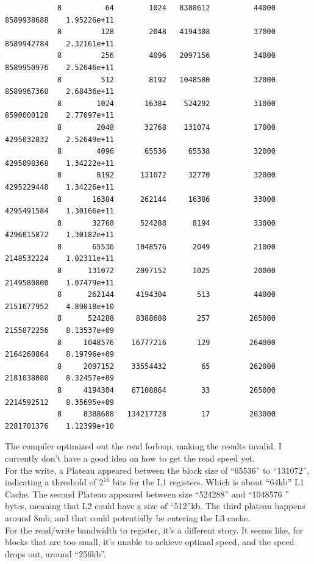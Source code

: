 \documentclass[]{article}
\begin{document}
\begin{lstlisting}
            8          64        1024   8388612          44000     8589938688    1.95226e+11
            8         128        2048   4194308          37000     8589942784    2.32161e+11
            8         256        4096   2097156          34000     8589950976    2.52646e+11
            8         512        8192   1048580          32000     8589967360    2.68436e+11
            8        1024       16384    524292          31000     8590000128    2.77097e+11
            8        2048       32768    131074          17000     4295032832    2.52649e+11
            8        4096       65536     65538          32000     4295098368    1.34222e+11
            8        8192      131072     32770          32000     4295229440    1.34226e+11
            8       16384      262144     16386          33000     4295491584    1.30166e+11
            8       32768      524288      8194          33000     4296015872    1.30182e+11
            8       65536     1048576      2049          21000     2148532224    1.02311e+11
            8      131072     2097152      1025          20000     2149580800    1.07479e+11
            8      262144     4194304       513          44000     2151677952    4.89018e+10
            8      524288     8388608       257         265000     2155872256    8.13537e+09
            8     1048576    16777216       129         264000     2164260864    8.19796e+09
            8     2097152    33554432        65         262000     2181038080    8.32457e+09
            8     4194304    67108864        33         265000     2214592512    8.35695e+09
            8     8388608   134217728        17         203000     2281701376    1.12399e+10
    \end{lstlisting}
    The compiler optimized out the read forloop, making the results invalid. I currently don't have a good idea on how to get the read speed yet.
    \\[1.1em]
    For the write, a Plateau appeared between the block size of ``65536'' to ``131072'', indicating a threshold of $2^{16}$ bits for the L1 registers. Which is about ``64kb'' L1 Cache. The second Plateau appeared between size ``524288'' and ``1048576 '' bytes, meaning that L2 could have a size of ``512''kb. The third plateau happens around 8mb, and that could potentially be entering the L3 cache. 
    \\[1.1em]
    For the read/write bandwidth to register, it's a different story. It seems like, for blocks that are too small, it's unable to achieve optimal speed, and the speed drops out,  around ``256kb''. 
    \\[1.1em]
\end{document}
